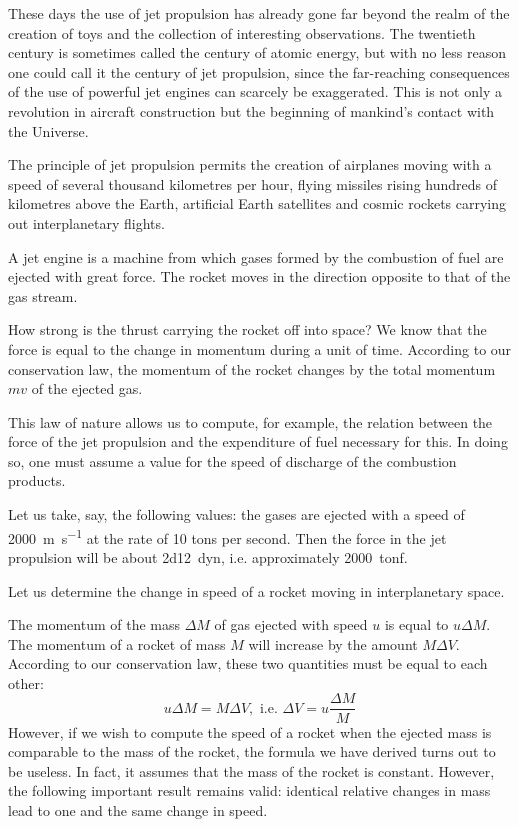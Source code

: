 These days the use of jet propulsion has already gone
far beyond the realm of the creation of toys and the collection of interesting observations. The twentieth century
is sometimes called the century of atomic energy, but
with no less reason one could call it the century of jet
propulsion, since the far-reaching consequences of the
use of powerful jet engines can scarcely be exaggerated. This is not only a revolution in aircraft construction but
the beginning of mankind's contact with the Universe.

The principle of jet propulsion permits the creation
of airplanes moving with a speed of several thousand
kilometres per hour, flying missiles rising hundreds of
kilometres above the Earth, artificial Earth satellites and
cosmic rockets carrying out interplanetary flights.

A jet engine is a machine from which gases formed by
the combustion of fuel are ejected with great force. The
rocket moves in the direction opposite to that of the gas
stream.

How strong is the thrust carrying the rocket off into
space? We know that the force is equal to the change in
momentum during a unit of time. According to our conservation law, the momentum of the rocket changes by the total momentum $mv$ of the ejected gas.

This law of nature allows us to compute, for example,
the relation between the force of the jet propulsion and
the expenditure of fuel necessary for this. In doing so,
one must assume a value for the speed of discharge of the
combustion products. 

Let us take, say, the following values: the gases are ejected with a speed of \SI{2000}{\meter\per\second} at the rate of 10 tons per second. Then the force in the jet propulsion will be about \num{2d12}~dyn, i.e. approximately \num{2000}~tonf.

Let us determine the change in speed of a rocket moving
in interplanetary space.

The momentum of the mass $\Delta M$ of gas ejected with
speed $u$ is equal to $u \Delta M$. The momentum of a rocket of
mass $M$ will increase by the amount $M \Delta V$. According
to our conservation law, these two quantities must be
equal to each other:
\begin{equation*}%
u \Delta M = M \Delta V, \,\, \textrm{i.e.} \,\, \Delta V = u \frac{\Delta M}{M}
\end{equation*}
However, if we wish to compute the speed of a rocket
when the ejected mass is comparable to the mass of the
rocket, the formula we have derived turns out to be
useless. In fact, it assumes that the mass of the rocket
is constant. However, the following important result
remains valid: identical relative changes in mass lead
to one and the same change in speed.

